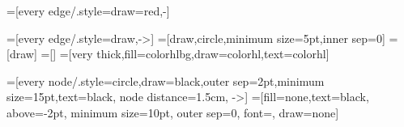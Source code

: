 =[every edge/.style={draw=red,-}]

=[every edge/.style={draw,->}]
=[draw,circle,minimum size=5pt,inner sep=0]
=[draw]
=[]
=[very thick,fill=colorhlbg,draw=colorhl,text=colorhl]




=[every node/.style={circle,draw=black,outer sep=2pt,minimum
                size=15pt,text=black}, node distance=1.5cm, ->]
=[fill=none,text=black, above=-2pt,%
minimum size=10pt, outer sep=0, font=\scriptsize, draw=none]




